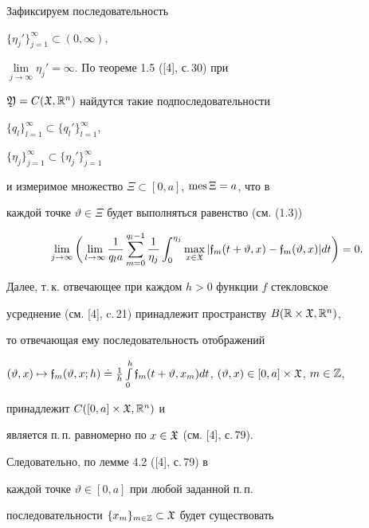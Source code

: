 \begin{pf}


Зафиксируем последовательность


$\{\eta_j'\}_{j=1}^{\infty}\subset(0,\infty)$,


$\lim\limits_{j\to\infty}\eta_j'=\infty$. По теореме 1.5 ([4], с.\,30) при


$\frak Y=C(\frak X,\Bbb R^n)$ найдутся такие подпоследовательности


$\{q_l\}_{l=1}^{\infty}\subset\{q_l'\}_{l=1}^{\infty}$,


$\{\eta_j\}_{j=1}^{\infty} \subset\{\eta_j'\}_{j=1}^{\infty}$


и измеримое множество $\Xi\subset[0,a]$, $\operatorname{mes}\Xi=a$, что в


каждой точке $\vartheta\in\Xi$ будет выполняться равенство (см. (1.3))


$$


\lim_{j\to\infty}\bigg(\lim_{l\to\infty}\frac{1}{q_la}


\sum_{m=0}^{q_l-1}


\frac{1}{\eta_j}\int_0^{\eta_j}\max_{x\in\frak X}


|\frak f_m(t+\vartheta,x)-\frak f_m(\vartheta,x)|dt\bigg)=0.


$$





Далее, т.\,к. отвечающее при каждом $h>0$ функции $f$ стекловское


усреднение (см. [4], c.\,21) принадлежит пространству $B(\Bbb


R\times\frak X,\Bbb R^n)$,


то отвечающая ему последовательность отображений


$(\vartheta,x)\mapsto\frak f_m(\vartheta,x;h)\doteq


\frac{1}{h}\int\limits_0^h


\frak f_m(t+\vartheta,x_m)dt$, $(\vartheta,x)\in


[0,a]\times\frak X$, $m\in{\Bbb Z}$,


принадлежит $C([0,a]\times\frak X,\Bbb R^n)$ и


является п.\,п. равномерно по $x\in\frak X$ (см. [4], с.\,79).


Следовательно, по лемме 4.2 ([4], с.\,79) в


каждой точке $\vartheta\in [0,a]$ при любой заданной п.\,п.


последовательности $\{x_m\}_{m\in{\Bbb Z}}\subset\frak X$ будет существовать



\end{pf}
